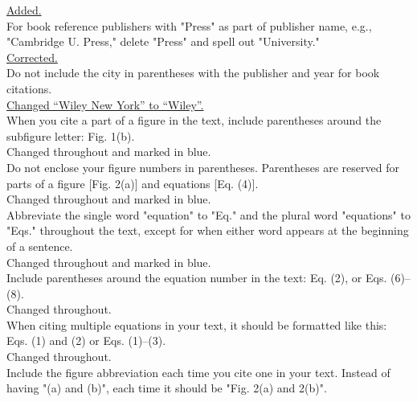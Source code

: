 \documentclass[10pt]{article}
\begin{document}
\hyperlink{copyright}{\color{urlblue} Added.}\\

{\color{OE} For book reference publishers with "Press" as part of publisher
  name, e.g., "Cambridge U. Press," delete "Press" and spell out "University."}\\

\hyperlink{press}{\color{urlblue} Corrected.}\\

{\color{OE} Do not include the city in parentheses with the publisher and year
  for book citations.}\\

\hyperlink{wiley}{\color{urlblue} Changed ``Wiley New York'' to ``Wiley''.}\\

{\color{OE} When you cite a part of a figure in the text, include parentheses
  around the subfigure letter: Fig. 1(b).}\\

Changed throughout and marked in blue.\\

{\color{OE} Do not enclose your figure numbers in parentheses. Parentheses are
  reserved for parts of a figure [Fig. 2(a)] and equations [Eq. (4)].}\\

Changed throughout and marked in blue.\\

{\color{OE} Abbreviate the single word "equation" to "Eq." and the plural word
  "equations" to "Eqs." throughout the text, except for when either word appears
  at the beginning of a sentence.}\\

Changed throughout and marked in blue.\\

{\color{OE} Include parentheses around the equation number in the text:
  Eq. (2), or Eqs. (6)--(8).}\\

Changed throughout.\\

{\color{OE} When citing multiple equations in your text, it should be
  formatted like this: Eqs. (1) and (2) or Eqs. (1)--(3).}\\

Changed throughout.\\

{\color{OE} Include the figure abbreviation each time you cite one in your
  text. Instead of having "(a) and (b)", each time it should be "Fig. 2(a) and
  2(b)".}\\
\end{document}
